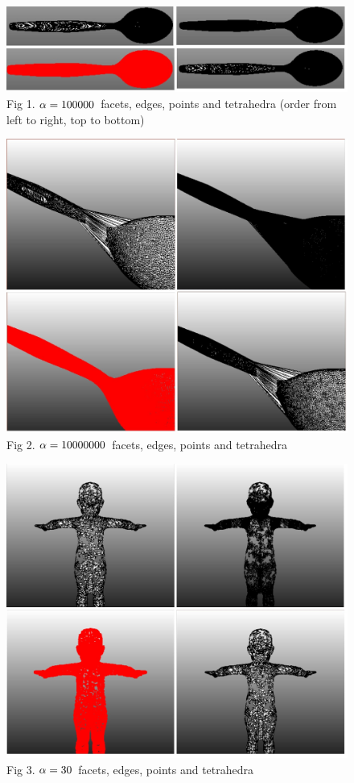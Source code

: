 \documentclass[11pt]{article}
\begin{document}
\begin{figure}[h]
  \includegraphics[width=120mm]{spoon 10000.jpg}\\
  Fig 1. $\alpha=100000\hspace{0.15cm}$facets, edges, points and tetrahedra (order from left to right, top to bottom)
\end{figure}

\begin{figure}[h]
  \includegraphics[width=120mm]{spoon 10000000.jpg}\\
  Fig 2. $\alpha=10000000\hspace{0.15cm}$facets, edges, points and tetrahedra
\end{figure}


\begin{figure}[h]
  \includegraphics[width=120mm]{bb 30.jpg}\\
  Fig 3. $\alpha=30\hspace{0.15cm}$facets, edges, points and tetrahedra
\end{figure}
\end{document}
